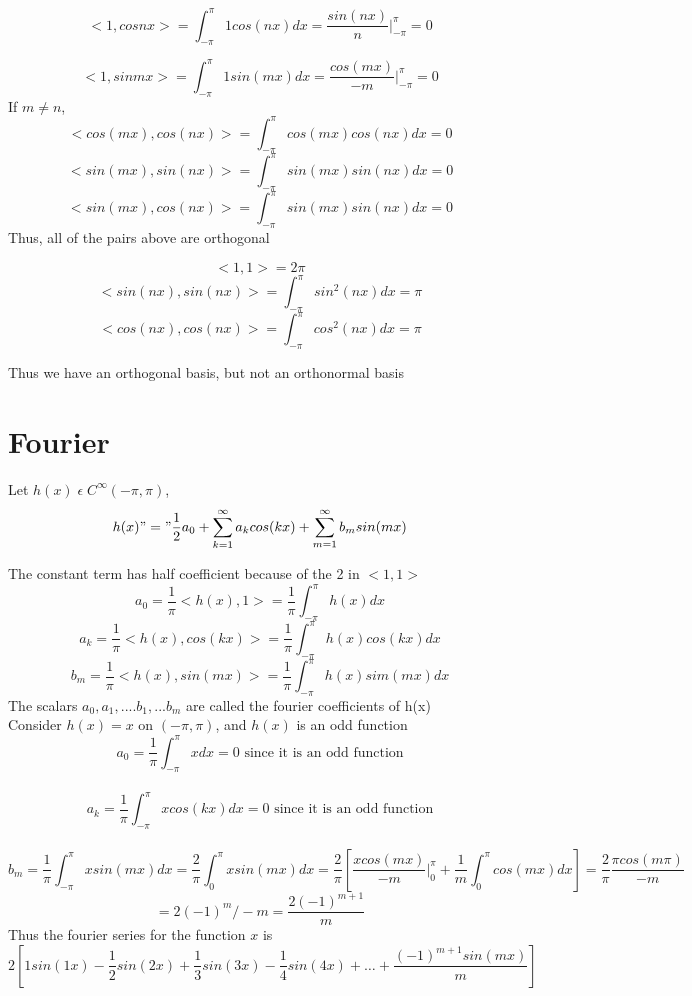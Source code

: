 \documentclass[11pt]{article}
\theoremstyle{definition}
\begin{document}
$$<1,cosnx> = \int^\pi_{-\pi} 1cos(nx)dx = \frac{sin(nx)}{n}|^{\pi}_{-\pi} = 0$$

$$<1,sinmx> = \int^\pi_{-\pi} 1sin(mx)dx = 
\frac{cos(mx)}{-m}|^{\pi}_{-\pi} = 0$$
If $m \neq n$,
$$<cos(mx),cos(nx)> = \int^\pi_{-\pi} cos(mx)cos(nx)dx = 0$$
$$<sin(mx),sin(nx)> = \int^\pi_{-\pi} sin(mx)sin(nx)dx = 0$$
$$<sin(mx),cos(nx)> = \int^\pi_{-\pi} sin(mx)sin(nx)dx = 0$$
Thus,  all of the pairs above are orthogonal

$$<1,1> = 2\pi$$
$$<sin(nx), sin(nx)> = \int^\pi_{-\pi} sin^2(nx) dx = \pi$$ $$<cos(nx), cos(nx)> = \int^\pi_{-\pi} cos^2(nx) dx = \pi$$

Thus we have an orthogonal basis, but not an orthonormal basis
\section{Fourier}
Let $h(x)\; \epsilon\; C^\infty (-\pi, \pi)$,
$$h(x) "=" \frac{1}{2}a_0 + \sum ^\infty_{k=1}a_kcos(kx) + \sum ^\infty_{m=1}b_msin(mx)$$

The constant term has half coefficient because of the 2 in $<1,1>$
$$a_0 = \frac{1}{\pi}<h(x), 1> = \frac{1}{\pi}\int^\pi_{-\pi} h(x)dx$$
$$a_k = \frac{1}{\pi}<h(x), cos(kx)> = \frac{1}{\pi}\int^\pi_{-\pi} h(x)cos(kx)dx$$
$$b_m = \frac{1}{\pi}<h(x), sin(mx)> = \frac{1}{\pi}\int^\pi_{-\pi} h(x)sim(mx)dx$$
The scalars $a_0, a_1, ....b_1, ...b_m$ are called the fourier coefficients of h(x)\\
Consider $h(x) = x$ on $(-\pi, \pi)$, and $h(x)$ is an odd function\\
$$a_0 = \frac{1}{\pi}\int^\pi_{-\pi}xdx = 0 \text{ since it is an odd function}$$\\
$$a_k = \frac{1}{\pi}\int^\pi_{-\pi}xcos(kx)dx = 0 \text{ since it is an odd function}$$\\
$$b_m = \frac{1}{\pi}\int^\pi_{-\pi}xsin(mx)dx = \frac{2}{\pi}\int^\pi_{0}xsin(mx)dx = \frac{2}{\pi}[\frac{xcos(mx)}{-m}|_0^\pi + \frac{1}{m}\int^\pi_0cos(mx)dx] = \frac{2}{\pi}\frac{\pi cos(m\pi)}{-m}$$ 
$$= 2(-1)^m/-m = \frac{2(-1)^{m+1}}{m}$$
Thus the fourier series for the function $x$ is 
$$2[1sin(1x) -\frac{1}{2}sin(2x) + \frac{1}{3}sin(3x) -\frac{1}{4}sin(4x)+\dots + \frac{(-1)^{m+1}sin(mx)}{m}]$$
\end{document}
